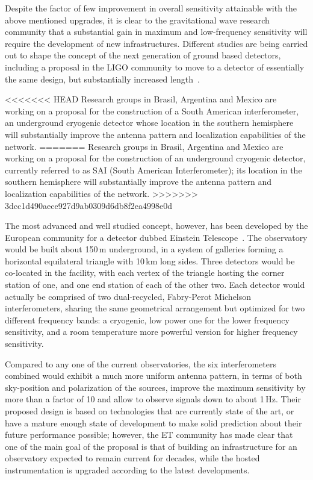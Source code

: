 Despite the factor of few improvement in overall sensitivity attainable with the above mentioned upgrades, it is clear to the gravitational wave research community that a substantial gain in maximum and low-frequency sensitivity will require the development of new infrastructures. 
Different studies are being carried out to shape the concept of the next generation of ground based detectors, including a proposal in the LIGO community to move to a detector of essentially the same design, but substantially increased length~\cite{Dwyer2015}.

<<<<<<< HEAD
Research groups in Brasil, Argentina and Mexico are working on a proposal for the construction of a South American interferometer, an underground cryogenic detector whose location in the southern hemisphere will substantially improve the antenna pattern and localization capabilities of the network.
=======
Research groups in Brasil, Argentina and Mexico are working on a proposal for the construction of an underground cryogenic detector, currently referred to as SAI (South American Interferometer);  its location in the southern hemisphere will substantially improve the antenna pattern and localization capabilities of the network.
>>>>>>> 3dcc1d490aece927d9ab0309d6db8f2ea4998e0d

The most advanced and well studied concept, however, has been developed by the European community for a detector dubbed Einstein Telescope~\cite{Punturo2010}.
The observatory would be built about 150\,m underground, in a system of galleries forming a horizontal equilateral triangle with 10\,km long sides. Three detectors would be co-located in the facility, with each vertex of the triangle hosting the corner station of one, and one end station of each of the other two.
Each detector would actually be comprised of two dual-recycled, Fabry-Perot Michelson  interferometers, sharing the same geometrical arrangement but optimized for two different frequency bands: a cryogenic, low power one for the lower frequency sensitivity, and a room temperature more powerful version for higher frequency sensitivity.

Compared to any one of the current observatories, the six interferometers combined would exhibit a much more uniform antenna pattern, in terms of both sky-position and polarization of the sources, improve the maximum sensitivity by more than a factor of 10 and allow to observe signals down to about 1\,Hz. 
Their proposed design is based on technologies that are currently state of the art, or have a mature enough state of development to make solid prediction about their future performance possible; however, the ET community has made clear that one of the main goal of the proposal is that of building an infrastructure for an observatory expected to remain current for decades, while the hosted instrumentation is upgraded according to the latest developments.

